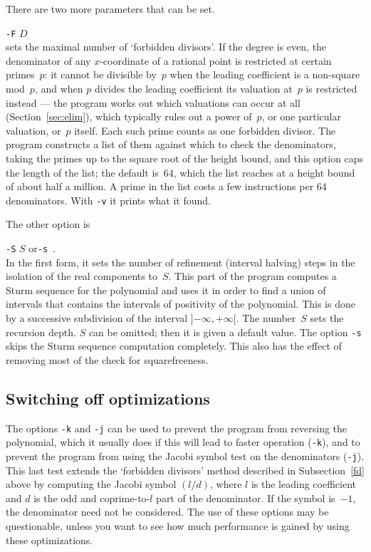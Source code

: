 \documentclass[12pt,a4paper,oneside]{amsart}
\begin{document}
There are two more parameters that can be set. \\
\strut\quad\verb+-F+ $D$ \\
sets the maximal number of `forbidden divisors'. If the degree is even,
the denominator of any $x$-coordinate of a rational point is restricted at
certain primes~$p$: it cannot be divisible by~$p$ when the leading
coefficient is a non-square mod~$p$, and when $p$ divides the leading
coefficient its valuation at~$p$ is restricted instead --- the program
works out which valuations can occur at all (Section~\ref{sec:elim}), which
typically rules out a power of~$p$, or one particular valuation, or~$p$
itself. Each such prime counts as one forbidden divisor. The program
constructs a list of them against which to check the denominators, taking
the primes up to the square root of the height bound, and this option caps
the length of the list; the default is~$64$, which the list reaches at a
height bound of about half a million. A prime in the list costs a few
instructions per 64 denominators. With \verb+-v+ it prints what it found.

The other option is \\
\strut\quad\verb+-S+ $S$ \quad or\quad \verb+-s+ \,. \\
In the first form, it sets the number of refinement (interval halving)
steps in the isolation of the real components to~$S$. This part of the
program computes a Sturm sequence for the polynomial and uses it in order
to find a union of intervals that contains the intervals of positivity
of the polynomial. This is done by a successive subdivision of the
interval $]{-\infty}, +\infty[$. The number~$S$ sets the recursion depth.
$S$ can be omitted; then it is given a default value. The option
\verb+-s+ skips the Sturm sequence computation completely. This also has
the effect of removing most of the check for squarefreeness.

\subsection{Switching off optimizations}

The options \verb+-k+ and \verb+-j+ can be used to prevent the program
from reversing the polynomial, which it usually does if this will lead
to faster operation (\verb+-k+), and to prevent the program from using
the Jacobi symbol test on the denominators (\verb+-j+). This last test
extends the `forbidden divisors' method described in
Subsection~\ref{fd} above by computing the Jacobi symbol $(l/d)$, where
$l$ is the leading coefficient and $d$ is the odd and coprime-to-$l$
part of the denominator. If the symbol is~$-1$, the denominator need not
be considered. The use of these options may be questionable, unless you
want to see how much performance is gained by using these optimizations.
\end{document}
